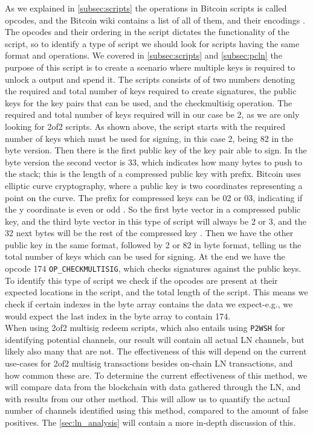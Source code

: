 As we explained in \cref{subsec:scripts} the operations in Bitcoin scripts is called opcodes, and the Bitcoin wiki contains a list of all of them, and their encodings \cite{bitcoin_wiki_scripts}. The opcodes and their ordering in the script dictates the functionality of the script, so to identify a type of script we should look for scripts having the same format and operations.
We covered in \cref{subsec:scripts} and \cref{subsec:pcln} the purpose of this script is to create a scenario where multiple keys is required to unlock a output and spend it.
The scripts consists of of two numbers denoting the required and total number of keys required to create signatures, the public keys for the key pairs that can be used, and the checkmultisig operation. The required and total number of keys required will in our case be 2, as we are only looking for 2of2 scripts.
As shown above, the script starts with the required number of keys which must be used for signing, in this case 2, being 82 in the byte version. Then there is the first public key of the key pair able to sign. 
In the byte version the second vector is 33, which indicates how many bytes to push to the stack; this is the length of a compressed public key with prefix. Bitcoin uses elliptic curve cryptography, where a public key is two coordinates representing a point on the curve. The prefix for compressed keys can be 02 or 03, indicating if the y coordinate is even or odd \cite{antonopoulos2017mastering}. So the first byte vector in a compressed public key, and the third byte vector in this type of script will always be 2 or 3, and the 32 next bytes will be the rest of the compressed key {\tt <public key 1>}. Then we have the other public key {\tt <public key 2>} in the same format, followed by 2 or 82 in byte format, telling us the total number of keys which can be used for signing. At the end we have the opcode 174 {\tt OP\_CHECKMULTISIG}, which checks signatures against the public keys. To identify this type of script we check if the opcodes are present at their expected locations in the script, and the total length of the script. This means we check if certain indexes in the byte array contains the data we expect-e.g., we would expect the last index in the byte array to contain 174.
\\

When using 2of2 multisig redeem scripts, which also entails using {\tt P2WSH} for identifying potential channels, our result will contain all actual LN channels, but likely also many that are not. The effectiveness of this will depend on the current use-cases for 2of2 multisig transactions besides on-chain LN transactions, and how common these are. To determine the current effectiveness of this method, we will compare data from the blockchain with data gathered through the LN, and with results from our other method. This will allow us to quantify the actual number of channels identified using this method, compared to the amount of false positives.
The \cref{sec:ln_analysis} will contain a more in-depth discussion of this.

